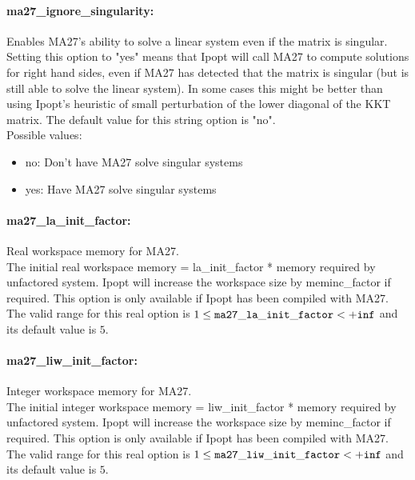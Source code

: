 \paragraph{ma27\_ignore\_singularity:}\label{sec:ma27_ignore_singularity} Enables MA27's ability to solve a linear system even if the matrix is singular. $\;$ \\
 Setting this option to "yes" means that Ipopt
will call MA27 to compute solutions for right
hand sides, even if MA27 has detected that the
matrix is singular (but is still able to solve
the linear system). In some cases this might be
better than using Ipopt's heuristic of small
perturbation of the lower diagonal of the KKT
matrix.
The default value for this string option is "no".
\\ 
Possible values:
\begin{itemize}
   \item no: Don't have MA27 solve singular systems
   \item yes: Have MA27 solve singular systems
\end{itemize}

\paragraph{ma27\_la\_init\_factor:}\label{sec:ma27_la_init_factor} Real workspace memory for MA27. $\;$ \\
 The initial real workspace memory =
la\_init\_factor * memory required by unfactored
system. Ipopt will increase the workspace size by
meminc\_factor if required.  This option is only
available if  Ipopt has been compiled with MA27. The valid range for this real option is 
$1 \le {\tt ma27\_la\_init\_factor } <  {\tt +inf}$
and its default value is $5$.


\paragraph{ma27\_liw\_init\_factor:}\label{sec:ma27_liw_init_factor} Integer workspace memory for MA27. $\;$ \\
 The initial integer workspace memory =
liw\_init\_factor * memory required by unfactored
system. Ipopt will increase the workspace size by
meminc\_factor if required.  This option is only
available if Ipopt has been compiled with MA27. The valid range for this real option is 
$1 \le {\tt ma27\_liw\_init\_factor } <  {\tt +inf}$
and its default value is $5$.


